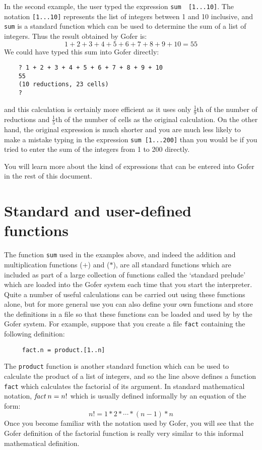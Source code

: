 In the second example, the user typed  the  expression  \verb"sum  [1...10]".
The notation \verb"[1...10]" represents the list of integers between 1 and 10
inclusive, and \verb"sum" is a  standard  function  which  can  be  used  to
determine the sum of a list of integers.  Thus the result  obtained  by
Gofer is:
\[
          1 + 2 + 3 + 4 + 5 + 6 + 7 + 8 + 9 + 10  =  55
\]
We could have typed this sum into Gofer directly:
\begin{verbatim}
    ? 1 + 2 + 3 + 4 + 5 + 6 + 7 + 8 + 9 + 10
    55
    (10 reductions, 23 cells)
    ? 
\end{verbatim}
and this calculation is certainly more efficient as it uses only
$\frac{1}{9}$th of the number of reductions and 
$\frac{1}{5}$th of the number  of  cells  as  the
original calculation.  On the other hand, the  original  expression  is
much shorter and you are much less likely to make a mistake  typing  in
the expression \verb"sum [1...200]" than you would be if you tried  to  enter
the sum of the integers from 1 to 200 directly.

You will learn more about the kind of expressions that can  be  entered
into Gofer in the rest of this document.


\chapter{Standard and user-defined functions}

The function \verb"sum" used in the examples above, and indeed the  addition
and multiplication functions ($+$) and ($*$), are  all  standard  functions
which are included as part of a large collection  of  functions  called
the `standard prelude' which are loaded into the Gofer system each time
that you start the interpreter.  Quite a number of useful  calculations
can be carried out using these functions alone, but  for  more  general
use you can also define your own functions and store the definitions in
a file so that these functions can be loaded and used by by  the  Gofer
system.  For example, suppose that you create a file \verb"fact"  containing
the following definition:
\begin{verbatim}
     fact.n = product.[1..n]
\end{verbatim}
The \verb"product" function is another standard function which can  be  used
to calculate the product of a list of integers, and so the  line  above
defines a  function  \verb"fact"  which  calculates  the  factorial  of  its
argument.  In standard  mathematical notation,  $\mbox{{\it fact}}\; n = n!$   which  is
usually defined informally by an equation of the form:
\[
     n! = 1 * 2 * \cdots * (n-1) * n
\]
Once you become familiar with the notation used by Gofer, you will  see
that the Gofer definition of the  factorial  function  is  really  very
similar to this informal mathematical definition.

